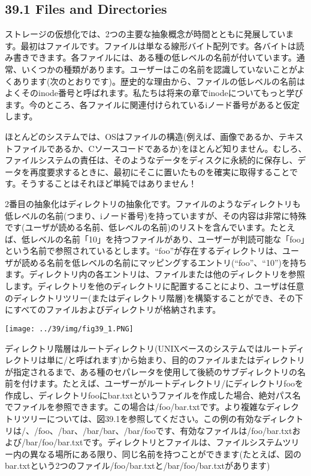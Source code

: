 \hypertarget{files-and-directories}{%
\subsection*{39.1 Files and Directories}\label{files-and-directories}}

ストレージの仮想化では、2つの主要な抽象概念が時間とともに発展しています。最初はファイルです。ファイルは単なる線形バイト配列です。各バイトは読み書きできます。各ファイルには、ある種の低レベルの名前が付いています。通常、いくつかの種類があります。ユーザーはこの名前を認識していないことがよくあります(次のとおりです)。歴史的な理由から、ファイルの低レベルの名前はよくそのinode番号と呼ばれます。私たちは将来の章でinodeについてもっと学びます。今のところ、各ファイルに関連付けられているiノード番号があると仮定します。

ほとんどのシステムでは、OSはファイルの構造(例えば、画像であるか、テキストファイルであるか、Cソースコードであるか)をほとんど知りません。むしろ、ファイルシステムの責任は、そのようなデータをディスクに永続的に保存し、データを再度要求するときに、最初にそこに置いたものを確実に取得することです。そうすることはそれほど単純ではありません！

2番目の抽象化はディレクトリの抽象化です。ファイルのようなディレクトリも低レベルの名前(つまり、iノード番号)を持っていますが、その内容は非常に特殊です(ユーザが読める名前、低レベルの名前)のリストを含んでいます。たとえば、低レベルの名前「10」を持つファイルがあり、ユーザーが判読可能な「foo」という名前で参照されているとします。``foo''が存在するディレクトリは、ユーザが読める名前を低レベルの名前にマッピングするエントリ(``foo''、``10'')を持ちます。ディレクトリ内の各エントリは、ファイルまたは他のディレクトリを参照します。ディレクトリを他のディレクトリに配置することにより、ユーザは任意のディレクトリツリー(またはディレクトリ階層)を構築することができ、その下にすべてのファイルおよびディレクトリが格納されます。

\texttt{[image: ../39/img/fig39\_1.PNG]}

ディレクトリ階層はルートディレクトリ(UNIXベースのシステムではルートディレクトリは単に/と呼ばれます)から始まり、目的のファイルまたはディレクトリが指定されるまで、ある種のセパレータを使用して後続のサブディレクトリの名前を付けます。たとえば、ユーザーがルートディレクトリ/にディレクトリfooを作成し、ディレクトリfooにbar.txtというファイルを作成した場合、絶対パス名でファイルを参照できます。この場合は/foo/bar.txtです。より複雑なディレクトリツリーについては、図39.1を参照してください。この例の有効なディレクトリは/、/foo、/bar、/bar/bar、/bar/fooです、有効なファイルは/foo/bar.txtおよび/bar/foo/bar.txtです。ディレクトリとファイルは、ファイルシステムツリー内の異なる場所にある限り、同じ名前を持つことができます(たとえば、図のbar.txtという2つのファイル/foo/bar.txtと/bar/foo/bar.txtがあります)

